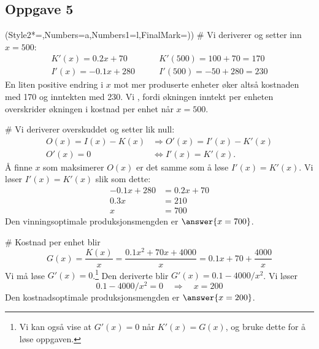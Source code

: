 \subsection*{Oppgave 5}
\begin{easylist}[enumerate]
	\ListProperties(Style2*=,Numbers=a,Numbers1=l,FinalMark={)})
	# Vi deriverer og setter inn $x = 500$:
	\begin{align*}
		K'(x) = 0.2x +70 \qquad & K'(500) = 100 + 70 = 170 \\
		I'(x) = -0.1x +280 \qquad & I'(500) = -50 + 280 = 230 
	\end{align*}
	En liten positive endring i $x$ mot mer produserte enheter øker altså
	kostnaden med 170 og inntekten med 230. Vi , fordi økningen inntekt per enheten overskrider økningen i kostnad per enhet når $x = 500$.

	# Vi deriverer overskuddet og setter lik null:
	\begin{align*}
		O(x) = I(x) - K(x) &\Rightarrow O'(x) = I'(x) - K'(x) \\
		O'(x) = 0 &\Leftrightarrow I'(x) = K'(x).
	\end{align*}
	Å finne $x$ som maksimerer $O(x)$ er det samme som å løse $I'(x) = K'(x)$.
	Vi løser $I'(x) = K'(x)$ slik som dette:
	\begin{align*}
		-0.1x +280  &=  0.2x +70 \\
		0.3 x &= 210 \\
		x &= 700
	\end{align*}
	Den vinningsoptimale produksjonsmengden er $\answer{x = 700}$.
	
	# Kostnad per enhet blir
	\begin{equation*}
		G(x) = \frac{K(x)}{x} = \frac{0.1x^2 + 70x +4000}{x} =  0.1x + 70 + \frac{4000}{x}
	\end{equation*}
	Vi må løse $G'(x) = 0$.\footnote{Vi kan også vise at $G'(x) = 0$ når $K'(x) = G(x)$, og bruke dette for å løse oppgaven.} Den deriverte blir $G'(x) = 0.1 -4000/x^2$.
	Vi løser
	\begin{equation*}
		0.1 -4000/x^2 = 0 \quad \Rightarrow \quad x = 200
	\end{equation*}
	Den kostnadsoptimale produksjonsmengden er $\answer{x = 200}$.
\end{easylist}

